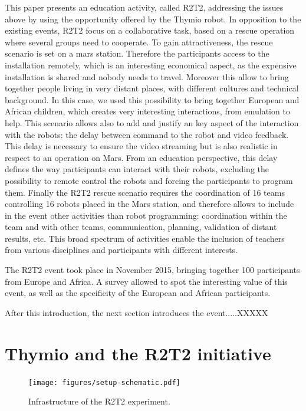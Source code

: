 \documentclass{intech-journal}
\begin{document}
This paper presents an education activity, called R2T2, addressing the issues above by using the opportunity offered by the Thymio robot. 
In opposition to the existing events, R2T2 focus on a collaborative task, based on a rescue operation where several groups need to cooperate.
To gain attractiveness, the rescue scenario is set on a mars station. 
Therefore the participants access to the installation remotely, which is an interesting economical aspect, as the expensive installation is shared and nobody needs to travel.
Moreover this allow to bring together people living in very distant places, with different cultures and technical background. In this case, we used this possibility to bring together European and African children, which creates very interesting interactions, from emulation to help.
This scenario allows also to add and justify an key aspect of the interaction with the robots: the delay between command to the robot and video feedback. 
This delay is necessary to ensure the video streaming but is also realistic in respect to an operation on Mars.
From an education perspective, this delay defines the way participants can interact with their robots, excluding the possibility to remote control the robots and forcing the participants to program them.
Finally the R2T2 rescue scenario requires the coordination of 16 teams controlling 16 robots placed in the Mars station, and therefore allows to include in the event other activities than robot programming: coordination within the team and with other teams, communication, planning, validation of distant results, etc.
This broad spectrum of activities enable the inclusion of teachers from various disciplines and participants with different interests.

The R2T2 event took place in November 2015, bringing together 100 participants from Europe and Africa. 
A survey allowed to spot the interesting value of this event, as well as the specificity of the European and African participants.

After this introduction, the next section introduces the event.....XXXXX



\section{Thymio and the R2T2 initiative}

\begin{figure}[ht]
 \centering
    \texttt{[image: figures/setup-schematic.pdf]}
  \caption{Infrastructure of the R2T2 experiment.}
  \label{fig:setup-scheme} 
\end{figure}
\end{document}
